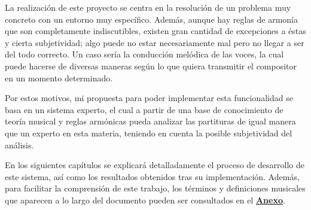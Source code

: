 La realización de este proyecto se centra en la resolución de un problema muy concreto con un entorno muy específico. Además, aunque hay reglas de armonía que son completamente indiscutibles, existen gran cantidad de excepciones a éstas y cierta subjetividad; algo puede no estar necesariamente mal pero no llegar a ser del todo correcto. Un caso sería la conducción melódica de las voces, la cual puede hacerse de diversas maneras según lo que quiera transmitir el compositor en un momento determinado.

Por estos motivos, mi propuesta para poder implementar esta funcionalidad se basa en un sistema experto, el cual a partir de una base de conocimiento de teoría musical y reglas armónicas pueda analizar las partituras de igual manera que un experto en esta materia, teniendo en cuenta la posible subjetividad del análisis.

En los siguientes capítulos se explicará detalladamente el proceso de desarrollo de este sistema, así como los resultados obtenidos tras su implementación. Además, para facilitar la comprensión de este trabajo, los términos y definiciones musicales que aparecen a lo largo del documento pueden ser consultados en el \hyperref[glosario]{\textbf{Anexo}}.


